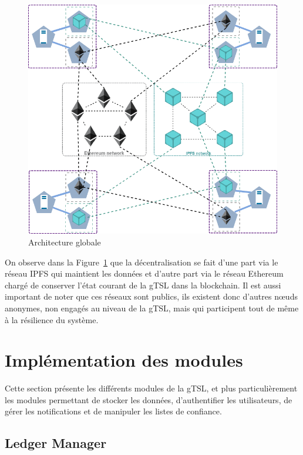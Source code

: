 \documentclass{tnreport}
\begin{document}
\begin{figure}[h]
	\centering
	\includegraphics[scale=0.58]{figures/architecture-global}
	\caption{Architecture globale}
	\label{fig:architecture-global}
\end{figure}

On observe dans la Figure~\ref{fig:architecture-global} que la décentralisation se fait d'une part via le réseau IPFS qui maintient les données et d'autre part via le réseau Ethereum chargé de conserver l'état courant de la gTSL dans la blockchain. Il est aussi important de noter que ces réseaux sont publics, ils existent donc d'autres nœuds anonymes, non engagés au niveau de la gTSL, mais qui participent tout de même à la résilience du système.

\section{Implémentation des modules}

Cette section présente les différents modules de la gTSL, et plus particulièrement les modules permettant de stocker les données, d'authentifier les utilisateurs, de gérer les notifications et de manipuler les listes de confiance.

\subsection{Ledger Manager}
\label{sec:realisation-ledger}
\end{document}
